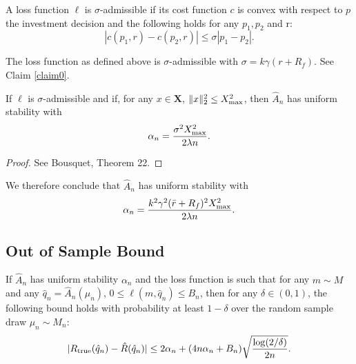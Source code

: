 \documentclass[11pt]{article}
\begin{document}
\begin{deff}
  A loss function $\ell$ is $\sigma$-admissible if its cost function $c$ is convex with
  respect to $p$ the investment decision and the following holds for any $p_1,p_2$ and r:
  \begin{equation*}
    |c(p_1,r) - c(p_2,r)| \leq \sigma|p_1-p_2|.
  \end{equation*}
\end{deff}

\begin{rem}
  The loss function as defined above is $\sigma$-admissible with $\sigma=k\gamma(r+R_f)$. See
  Claim \ref{claim0}.
\end{rem}

\begin{thm}
  If $\ell$ is $\sigma$-admissible and if, for any $x\in\bm X$, $\|x\|_2^2\leq X_{\max}^2$,
  then $\hat A_n$ has uniform stability with
  \begin{equation*}
    \alpha_n = \frac{\sigma^2 X_{\max}^2}{2\lambda n}.
  \end{equation*}
\end{thm}

\begin{proof}
  See Bousquet, Theorem 22. 
\end{proof}

We therefore conclude that $\hat A_n$ has uniform stability with
\begin{equation*}
  \alpha_n = \frac{k^2\gamma^2(\bar r+R_f)^2X_{\max}^2}{2\lambda n}.
\end{equation*}

\subsection{Out of Sample Bound}

\begin{thm}
  \label{thm2}
  If $\hat A_n$ has uniform stability $\alpha_n$ and the loss function is such that for
  any $m\sim M$ and any $\hat q_n=\hat A_n(\mu_n)$, $0\leq \ell(m,\hat q_n)\leq B_n$, then
  for any $\delta\in(0,1)$, the following bound holds with probability at least $1-\delta$
  over the random sample draw $\mu_n\sim M_n$:
  \begin{equation*}
    |R_{\mathrm{true}}({\hat q}_n) - \hat R({\hat q}_n)| \leq 2\alpha_n + (4n\alpha_n + B_n)\sqrt{\frac{\log(2/\delta)}{2n}}.
  \end{equation*}
\end{thm}
\end{document}
